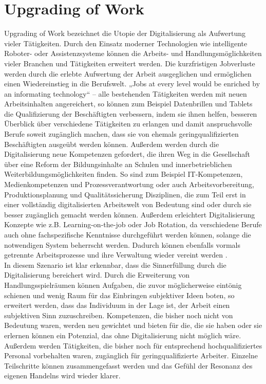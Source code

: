 \section{Upgrading of Work}
Upgrading of Work bezeichnet die Utopie der Digitalisierung als Aufwertung vieler Tätigkeiten. Durch den Einsatz moderner Technologien wie intelligente Roboter- oder Assistenzsysteme können die Arbeits- und Handlungsmöglichkeiten vieler Branchen und Tätigkeiten erweitert werden. Die kurzfristigen Jobverluste werden durch die erlebte Aufwertung der Arbeit ausgeglichen und ermöglichen einen Wiedereinstieg in die Berufswelt. „Jobs at every level would be enriched by an informating technology“ – alle bestehenden Tätigkeiten werden mit neuen Arbeitsinhalten angereichert, so können zum Beispiel Datenbrillen und Tablets die Qualifizierung der Beschäftigten verbessern, indem sie ihnen helfen, besseren Überblick über verschiedene Tätigkeiten zu erlangen und damit anspruchsvolle Berufe soweit zugänglich machen, dass sie von ehemals geringqualifizierten Beschäftigten ausgeübt werden können. Außerdem werden durch die Digitalisierung neue Kompetenzen gefordert, die ihren Weg in die Gesellschaft über eine Reform der Bildungsinhalte an Schulen und innerbetrieblichen Weiterbildungsmöglichkeiten finden. So sind zum Beispiel IT-Kompetenzen, Medienkompetenzen und Prozessverantwortung oder auch Arbeitsvorbereitung, Produktionsplanung und Qualitätssicherung Disziplinen, die zum Teil erst in einer vollständig digitalisierten Arbeitswelt von Bedeutung sind oder durch sie besser zugänglich gemacht werden können. Außerdem erleichtert Digitalisierung Konzepte wie z.B. Learning-on-the-job oder Job Rotation, da verschiedene Berufe auch ohne fachspezifische Kenntnisse durchgeführt werden können, solange die notwendigen System beherrscht werden. Dadurch können ebenfalls vormals getrennte Arbeitsprozesse und ihre Verwaltung wieder vereint werden \cite[S.183]{Eisenmann.2018}.\\

In diesem Szenario ist klar erkennbar, dass die Sinnerfüllung durch die Digitalisierung bereichert wird. Durch die Erweiterung von Handlungsspielräumen können Aufgaben, die zuvor möglicherweise eintönig schienen und wenig Raum für das Einbringen subjektiver Ideen boten, so erweitert werden, dass das Individuum in der Lage ist, der Arbeit einen subjektiven Sinn zuzuschreiben. Kompetenzen, die bisher noch nicht von Bedeutung waren, werden neu gewichtet und bieten für die, die sie haben oder sie erlernen können ein Potenzial, das ohne Digitalisierung nicht möglich wäre. Außerdem werden Tätigkeiten, die bisher noch für entsprechend hochqualifiziertes Personal vorbehalten waren, zugänglich für geringqualifizierte Arbeiter. Einzelne Teilschritte können zusammengefasst werden und das Gefühl der Resonanz des eigenen Handelns wird wieder klarer.
